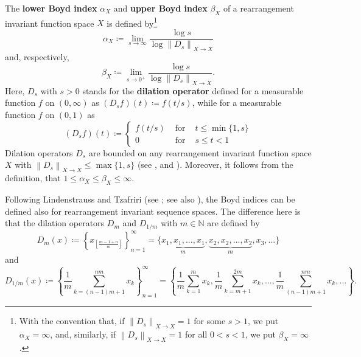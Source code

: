 \documentclass[11pt]{amsart}
\theoremstyle{definition}
\theoremstyle{definition}
\theoremstyle{definition}
\theoremstyle{definition}
\theoremstyle{definition}
\theoremstyle{definition}
\theoremstyle{definition}
\theoremstyle{definition}
\numberwithin{equation}{section}
\numberwithin{equation}{section}
\numberwithin{equation}{section}
\theoremstyle{definition}
\theoremstyle{definition}
\theoremstyle{definition}
\theoremstyle{definition}
\theoremstyle{definition}
\theoremstyle{definition}
\newcommand{\norm}[1]{\left\lVert#1\right\rVert}
\begin{document}
The {\bf lower Boyd index} $\alpha_X$ and {\bf upper Boyd index} $\beta_X$ of a rearrangement invariant function space $X$
is defined by\footnote{With the convention that, if $\norm{D_s}_{X \rightarrow X} = 1$
for some $s > 1$, we put $\alpha_X = \infty$, and, similarly, if $\norm{D_s}_{X \rightarrow X} = 1$
for all $0 < s < 1$, we put $\beta_X = \infty$.}
\begin{equation*}
	\alpha_X \coloneqq \lim\limits_{s \rightarrow \infty} \frac{\log s}{\log \norm{D_s}_{X \rightarrow X}}
\end{equation*}
and, respectively,
\begin{equation*}
	\beta_X \coloneqq \lim\limits_{s \rightarrow 0^{+}} \frac{\log s}{\log \norm{D_s}_{X \rightarrow X}}.
\end{equation*}
Here, $D_s$ with $s > 0$ stands for the {\bf dilation operator} defined for a measurable function $f$ on $(0,\infty)$
as $(D_s f)(t) \coloneqq f(t/s)$, while for a measurable function $f$ on $(0,1)$ as
	\[
	(D_s f)(t) \coloneqq \left\{ 
	\begin{array}{ccc}
		f(t/s)  & \text{ for } & t \leqslant \min\{1,s\} \\ 
		0  & \text{ for } & s \leqslant t < 1
	\end{array}
	\right.
	\]
Dilation operators $D_s$ are bounded on any rearrangement invariant function space $X$ with $\norm{D_s}_{X \rightarrow X} \leqslant \max\{1,s\}$
(see \cite[p.~148]{BS88}, \cite[pp.~96--98]{KPS82} and \cite[pp.~130--131]{LT79}).
Moreover, it follows from the definition, that $1 \leqslant \alpha_X \leqslant \beta_X \leqslant \infty$.

Following Lindenstrauss and Tzafriri \cite{LT79} (see \cite[p.~131]{LT79}; see also \cite[p.~165]{KPS82}),
the Boyd indices can be defined also for rearrangement invariant sequence spaces.
The difference here is that the dilation operators $D_m$ and $D_{1/m}$ with $m \in \mathbb{N}$ are defined by
\begin{equation*}
	D_m(x) \coloneqq \left\{ x_{[\frac{m-1+n}{m}]} \right\}_{n=1}^\infty = \{ \underbrace{x_1, x_1, ..., x_1}_{m}, \underbrace{x_2, x_2, ...,x_2}_{m}, x_3, ... \}
\end{equation*}
and
\begin{equation*}
	D_{1/m}(x) \coloneqq \left\{ \frac{1}{m} \sum_{k=(n-1)m+1}^{nm} x_k \right\}_{n=1}^\infty
	= \left\{ \frac{1}{m}\sum_{k=1}^m x_k, \frac{1}{m}\sum_{k=m+1}^{2m} x_k, ..., \frac{1}{m}\sum_{(n-1)m+1}^{nm}x_k, ... \right\}.
\end{equation*}
\end{document}
